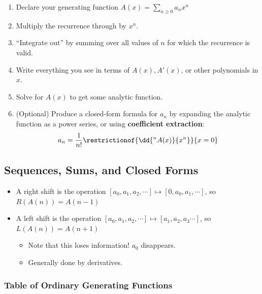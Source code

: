 \begin{enumerate}
\def\labelenumi{\arabic{enumi}.}
\tightlist
\item
  Declare your generating function
  \(A(x) = \displaystyle\sum_{n\geq 0} a_n x^n\)
\item
  Multiply the recurrence through by \(x^n\).
\item
  ``Integrate out'' by summing over all values of \(n\) for which the
  recurrence is valid.
\item
  Write everything you see in terms of \(A(x), A'(x)\), or other
  polynomials in \(x\).
\item
  Solve for \(A(x)\) to get some analytic function.
\item
  (Optional) Produce a closed-form formula for \(a_n\) by expanding the
  analytic function as a power series, or using \textbf{coefficient
  extraction}:
  \begin{align*}
  a_n = \frac{1}{n!} \restrictionof{\dd{^n A(x)}{x^n}}{x=0}
  \end{align*}
\end{enumerate}

\hypertarget{sequences-sums-and-closed-forms}{%
\subsection{Sequences, Sums, and Closed
Forms}\label{sequences-sums-and-closed-forms}}

\begin{itemize}
\tightlist
\item
  A right shift is the operation
  \([a_0, a_1, a_2, \cdots] \mapsto [0, a_0, a_1, \cdots]\), so
  \(R(A(n)) = A(n-1)\)
\item
  A left shift is the operation
  \([a_0, a_1, a_2, \cdots] \mapsto [a_1, a_2, a_3 \cdots]\), so
  \(L(A(n)) = A(n+1)\)

  \begin{itemize}
  \tightlist
  \item
    Note that this loses information! \(a_0\) disappears.
  \item
    Generally done by derivatives.
  \end{itemize}
\end{itemize}

\newpage

\hypertarget{table-of-ordinary-generating-functions}{%
\subsubsection{Table of Ordinary Generating
Functions}\label{table-of-ordinary-generating-functions}}

